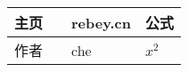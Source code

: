\documentclass{article}
\begin{document}
\begin{center}
\begin{table}
\begin{tabular}{|l|l|l|l|}
\hline 主页&&rebey.cn&公式\\\hline \hline 作者&&che&${x}^{2}$\\\hline 
\end{tabular}
\end{table}
\end{center}
\end{document}
